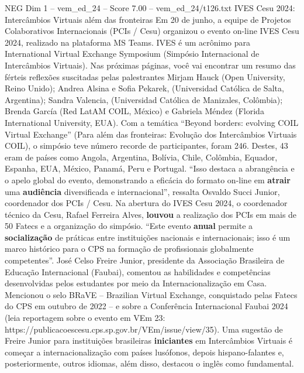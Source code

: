 \begin{textsample}{NEG Dim 1 – vem\_ed\_24 – Score 7.00 – vem\_ed\_24/t126.txt}  \label{ex:f1_neg_134}
IVES Cesu 2024: Intercâmbios Virtuais além das fronteiras Em 20 de junho, a equipe de Projetos Colaborativos Internacionais (PCIs / Cesu) organizou o evento on-line IVES Cesu 2024, realizado na plataforma MS Teams.
IVES é um acrônimo para International Virtual Exchange Symposium (Simpósio Internacional de Intercâmbios Virtuais).
Nas próximas páginas, você vai encontrar um resumo das férteis reflexões suscitadas pelas palestrantes Mirjam Hauck (Open University, Reino Unido); Andrea Alsina e Sofia Pekarek, (Universidad Católica de Salta, Argentina); Sandra Valencia, (Universidad Católica de Manizales, Colômbia); Brenda García (Red LatAM COIL, México) e Gabriela Méndez (Florida International University, EUA).
Com a temática “Beyond borders: evolving COIL Virtual Exchange” (Para além das fronteiras: Evolução dos Intercâmbios Virtuais COIL), o simpósio teve número recorde de participantes, foram 246.
Destes, 43 eram de países como Angola, Argentina, Bolívia, Chile, Colômbia, Equador, Espanha, EUA, México, Panamá, Peru e Portugal. “Isso destaca a abrangência e o apelo global do evento, demonstrando a eficácia do formato on-line em \textbf{atrair} uma \textbf{audiência} diversificada e internacional”, ressalta Osvaldo Succi Junior, coordenador dos PCIs / Cesu.
Na abertura do IVES Cesu 2024, o coordenador técnico da Cesu, Rafael Ferreira Alves, \textbf{louvou} a realização dos PCIs em mais de 50 Fatecs e a organização do simpósio. “Este evento \textbf{anual} permite a \textbf{socialização} de práticas entre instituições nacionais e internacionais; isso é um marco histórico para o CPS na formação de profissionais globalmente competentes”.
José Celso Freire Junior, presidente da Associação Brasileira de Educação Internacional (Faubai), comentou as habilidades e competências desenvolvidas pelos estudantes por meio da Internacionalização em Casa.
Mencionou o selo BRaVE – Brazilian Virtual Exchange, conquistado pelas Fatecs do CPS em outubro de 2022 – e sobre a Conferência Internacional Faubai 2024 (leia reportagem sobre o evento em VEm 23: https://publicacoescesu.cps.sp.gov.br/VEm/issue/view/35).
Uma sugestão de Freire Junior para instituições brasileiras \textbf{iniciantes} em Intercâmbios Virtuais é começar a internacionalização com países lusófonos, depois hispano-falantes e, posteriormente, outros idiomas, além disso, destacou o inglês como fundamental.

\end{textsample}
